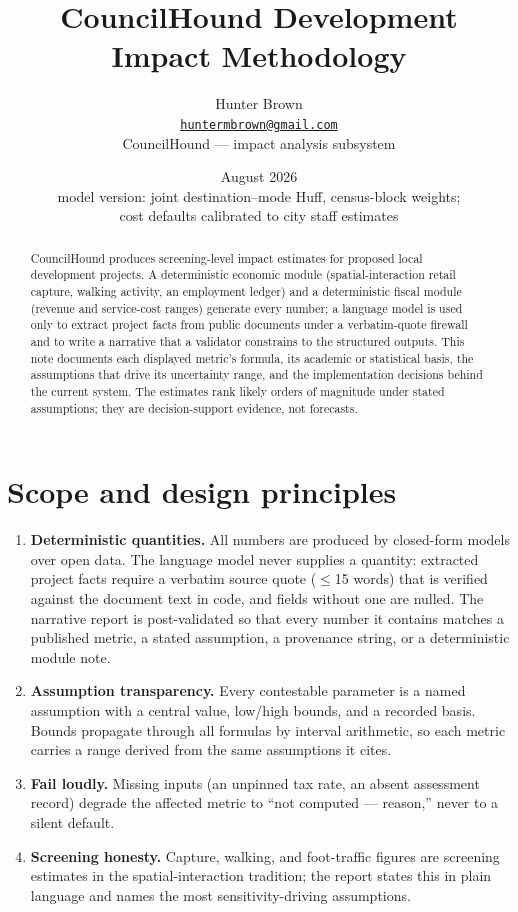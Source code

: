 \documentclass[11pt]{article}
\title{CouncilHound Development Impact Methodology}
\author{Hunter Brown \\ \small\href{mailto:huntermbrown@gmail.com}{\texttt{huntermbrown@gmail.com}} \\ \small CouncilHound --- impact analysis subsystem}
\date{August 2026 \\ \small model version: joint destination--mode Huff, census-block weights; \\ \small cost defaults calibrated to city staff estimates}
\begin{document}
\maketitle

\begin{abstract}
\noindent
CouncilHound produces screening-level impact estimates for proposed local development
projects. A deterministic economic module (spatial-interaction retail capture,
walking activity, an employment ledger) and a deterministic fiscal module
(revenue and service-cost ranges) generate every number; a language model is used
only to extract project facts from public documents under a verbatim-quote
firewall and to write a narrative that a validator constrains to the structured
outputs. This note documents each displayed metric's formula, its academic or
statistical basis, the assumptions that drive its uncertainty range, and the
implementation decisions behind the current system. The estimates rank likely
orders of magnitude under stated assumptions; they are decision-support
evidence, not forecasts.
\end{abstract}

\section{Scope and design principles}

\begin{enumerate}
\item \textbf{Deterministic quantities.} All numbers are produced by closed-form
      models over open data. The language model never supplies a quantity: extracted
      project facts require a verbatim source quote ($\leq$15 words) that is verified
      against the document text in code, and fields without one are nulled. The
      narrative report is post-validated so that every number it contains matches a
      published metric, a stated assumption, a provenance string, or a deterministic
      module note.
\item \textbf{Assumption transparency.} Every contestable parameter is a named
      assumption with a central value, low/high bounds, and a recorded basis. Bounds
      propagate through all formulas by interval arithmetic, so each metric carries a
      range derived from the same assumptions it cites.
\item \textbf{Fail loudly.} Missing inputs (an unpinned tax rate, an absent
      assessment record) degrade the affected metric to ``not computed --- reason,''
      never to a silent default.
\item \textbf{Screening honesty.} Capture, walking, and foot-traffic figures are
      screening estimates in the spatial-interaction tradition; the report states
      this in plain language and names the most sensitivity-driving assumptions.
\end{enumerate}
\end{document}
